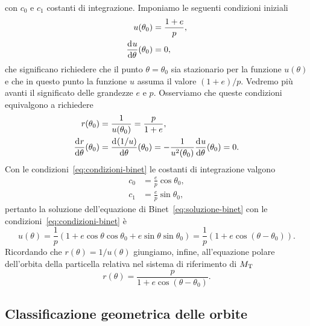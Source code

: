 con $c_0$ e $c_1$ costanti di integrazione. Imponiamo le seguenti condizioni
iniziali
\begin{subequations}
  \label{eq:condizioni-binet}
  \begin{align}
    u(\theta_0) &= \frac{1+e}{p},\\
    \frac{{\mathop{}\!\mathrm{d}^{}}u}{\mathop{}\!\mathrm{d} {\theta}^{}}(\theta_0) &= 0,
  \end{align}
\end{subequations}
che significano richiedere che il punto $\theta = \theta_0$ sia stazionario per
la funzione $u(\theta)$ e che in questo punto la funzione $u$ assuma il valore
$(1+e)/p$. Vedremo più avanti il significato delle grandezze $e$ e
$p$. Osserviamo che queste condizioni equivalgono a richiedere
\begin{subequations}
  \begin{align}
    r(\theta_0) &= \frac{1}{u(\theta_0)} = \frac{p}{1+e}, \\
    \frac{{\mathop{}\!\mathrm{d}^{}}r}{\mathop{}\!\mathrm{d} {\theta}^{}}(\theta_0) &= \frac{{\mathop{}\!\mathrm{d}^{}}(1/u)}{\mathop{}\!\mathrm{d} {\theta}^{}}(\theta_0) =
    -\frac{1}{u^2(\theta_0)} \frac{{\mathop{}\!\mathrm{d}^{}}u}{\mathop{}\!\mathrm{d} {\theta}^{}}(\theta_0) = 0.
  \end{align}
\end{subequations}
Con le condizioni~\eqref{eq:condizioni-binet} le costanti di integrazione
valgono
\begin{subequations}
  \label{eq:costanti-binet}
  \begin{align}
    c_0 &= \frac{e}{p}\cos\theta_0, \\
    c_1 &= \frac{e}{p}\sin\theta_0,
  \end{align}
\end{subequations}
pertanto la soluzione dell'equazione di Binet~\eqref{eq:soluzione-binet} con le
condizioni~\eqref{eq:condizioni-binet} è
\begin{equation}
  \label{eq:soluzione2-binet}
  u(\theta) = \frac{1}{p}(1 + e\cos\theta\cos\theta_0 +
  e\sin\theta\sin\theta_0) =  \frac{1}{p}(1+e\cos(\theta-\theta_0)).
\end{equation}
Ricordando che $r(\theta)=1/u(\theta)$ giungiamo, infine, all'equazione polare
dell'orbita della particella relativa nel sistema di riferimento di
$M_\textup{T}$
\begin{equation}
  \label{eq:orbita}
  r(\theta) = \frac{p}{1+e\cos(\theta-\theta_0)}.
\end{equation}

\subsection{Classificazione geometrica delle orbite}
\label{sec:class-geom-orbite}

